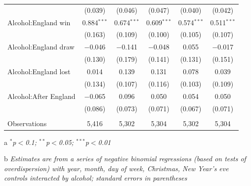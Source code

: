 \documentclass[12pt, letterpaper]{article}
\begin{document}
\begin{table}
{\begin{threeparttable}
\begin{tabular}{@{\extracolsep{5pt}}lccccc}
  & (0.039) & (0.046) & (0.047) & (0.040) & (0.042) \\ 
  Alcohol:England win & 0.884$^{***}$ & 0.674$^{***}$ & 0.609$^{***}$ & 0.574$^{***}$ & 0.511$^{***}$ \\ 
  & (0.163) & (0.109) & (0.100) & (0.105) & (0.107) \\ 
  Alcohol:England draw & $-$0.046 & $-$0.141 & $-$0.048 & 0.055 & $-$0.017 \\ 
  & (0.130) & (0.179) & (0.141) & (0.131) & (0.151) \\ 
  Alcohol:England lost & 0.014 & 0.139 & 0.131 & 0.078 & 0.039 \\ 
  & (0.134) & (0.107) & (0.116) & (0.103) & (0.109) \\ 
  Alcohol:After England & $-$0.065 & 0.096 & 0.050 & 0.054 & 0.050 \\ 
  & (0.086) & (0.073) & (0.071) & (0.067) & (0.071) \\ 
 \hline \\[-1.8ex] 
Observations & 5,416 & 5,302 & 5,304 & 5,302 & 5,304 \\ 
\hline 

\end{tabular} 
\begin{tablenotes}
      \item[a] \textit{$^{*}$p$<$0.1; $^{**}$p$<$0.05; $^{***}$p$<$0.01}
      \item[b] \textit{Estimates are from a series of negative binomial regressions (based on tests of overdispersion)  with year, month, day of week, Christmas, New Year's eve controls interacted by alcohol; standard errors in parentheses}
    \end{tablenotes}
\end{threeparttable} } 
\end{table}
\end{document}
